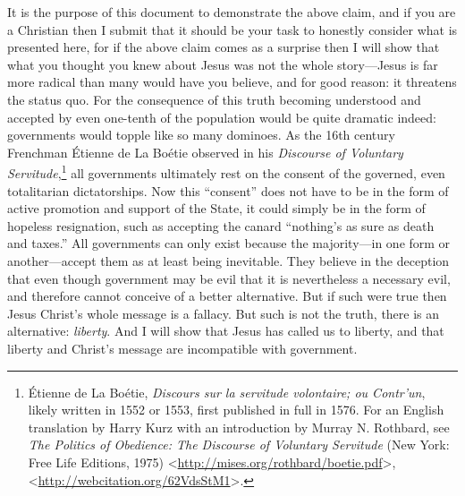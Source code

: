 \documentclass[letterpaper,12pt]{article}
\begin{document}
It is the purpose of this document to demonstrate the above claim, and if you are a Christian then I submit that it should be your task to honestly consider what is presented here, for if the above claim comes as a surprise then I will show that what you thought you knew about Jesus was not the whole story---Jesus is far more radical than many would have you believe, and for good reason: it threatens the status quo. For the consequence of this truth becoming understood and accepted by even one-tenth of the population would be quite dramatic indeed: governments would topple like so many dominoes. As the 16th century Frenchman \'{E}tienne de La Bo\'{e}tie observed in his \emph{Discourse of Voluntary Servitude},\footnote{\'{E}tienne de La Bo\'{e}tie, \emph{Discours sur la servitude volontaire; ou Contr'un}, likely written in 1552 or 1553, first published in full in 1576. For an English translation by Harry Kurz with an introduction by Murray N. Rothbard, see \emph{The Politics of Obedience: The Discourse of Voluntary Servitude} (New York: Free Life Editions, 1975) \textless\url{http://mises.org/rothbard/boetie.pdf}\textgreater , \textless\url{http://webcitation.org/62VdsStM1}\textgreater .} all governments ultimately rest on the consent of the governed, even totalitarian dictatorships. Now this ``consent'' does not have to be in the form of active promotion and support of the State, it could simply be in the form of hopeless resignation, such as accepting the canard ``nothing's as sure as death and taxes.'' All governments can only exist because the majority---in one form or another---accept them as at least being inevitable. They believe in the deception that even though government may be evil that it is nevertheless a necessary evil, and therefore cannot conceive of a better alternative. But if such were true then Jesus Christ's whole message is a fallacy. But such is not the truth, there is an alternative: \emph{liberty}. And I will show that Jesus has called us to liberty, and that liberty and Christ's message are incompatible with government.
\end{document}
